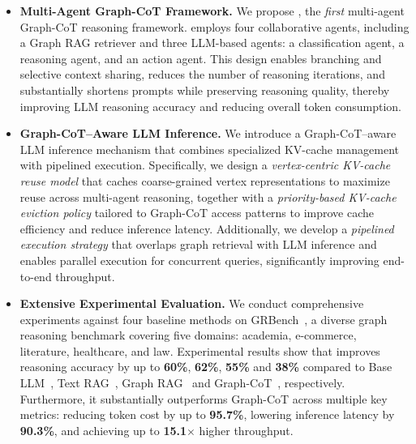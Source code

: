 \begin{itemize}[leftmargin=*, wide, itemindent=0pt, nosep]


    \item \textbf{Multi-Agent Graph-CoT Framework.} 
    We propose \projectname, the \textit{first} multi-agent Graph-CoT reasoning framework. 
    \projectname employs four collaborative agents, including a Graph RAG retriever and three LLM-based agents: a classification agent, a reasoning agent, and an action agent. 
    This design enables branching and selective context sharing, reduces the number of reasoning iterations, and substantially shortens prompts while preserving reasoning quality, thereby improving LLM reasoning accuracy and reducing overall token consumption.


    \item \textbf{Graph-CoT–Aware LLM Inference.}
    We introduce a Graph-CoT–aware LLM inference mechanism that combines specialized KV-cache management with pipelined execution. 
    Specifically, we design a \textit{vertex-centric KV-cache reuse model} that caches coarse-grained vertex representations to maximize reuse across multi-agent reasoning, together with a \textit{priority-based KV-cache eviction policy} tailored to Graph-CoT access patterns to improve cache efficiency and reduce inference latency. 
    Additionally, we develop a \textit{pipelined execution strategy} that overlaps graph retrieval with LLM inference and enables parallel execution for concurrent queries, significantly improving end-to-end throughput.


    \item \textbf{Extensive Experimental Evaluation.} We conduct comprehensive experiments against four baseline methods on GRBench~\cite{jin2024graph}, a diverse graph reasoning benchmark covering five domains: academia, e-commerce, literature, healthcare, and law. Experimental results show that \projectname improves reasoning accuracy by up to \textbf{60\%}, \textbf{62\%}, \textbf{55\%} and \textbf{38\%} compared to Base LLM~\cite{qwen}, Text RAG~\cite{gao2023retrieval}, Graph RAG~\cite{ye2023language} and Graph-CoT~\cite{jin2024graph}, respectively. Furthermore, it substantially outperforms Graph-CoT across multiple key metrics: reducing token cost by up to \textbf{95.7\%}, lowering inference latency by \textbf{90.3\%}, and achieving up to \textbf{15.1$\times$} higher throughput.
\end{itemize}

